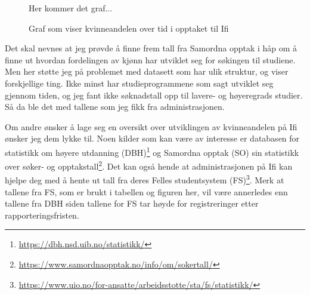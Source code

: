 \begin{figure}
	Her kommer det graf...
	\caption{Graf som viser kvinneandelen over tid i opptaket til Ifi}
	\label{figure:kvinneandel}
\end{figure}

Det skal nevnes at jeg prøvde å finne frem tall fra Samordna opptak i håp om å finne ut hvordan fordelingen av kjønn har utviklet seg for søkingen til studiene. Men her støtte jeg på problemet med datasett som har ulik struktur, og viser forskjellige ting. Ikke minst har studieprogrammene som sagt utviklet seg gjennom tiden, og jeg fant ikke søknadstall opp til lavere- og høyeregrads studier. Så da ble det med tallene som jeg fikk fra administrasjonen.

Om andre ønsker å lage seg en oversikt over utviklingen av kvinneandelen på Ifi ønsker jeg dem lykke til. Noen kilder som kan være av interesse er databasen for statistikk om høyere utdanning (DBH)\footnote{\url{https://dbh.nsd.uib.no/statistikk/}} og Samordna opptak (SO) sin statistikk over søker- og opptakstall\footnote{\url{https://www.samordnaopptak.no/info/om/sokertall/}}. Det kan også hende at administrasjonen på Ifi kan hjelpe deg med å hente ut tall fra deres Felles studentsystem (FS)\footnote{\url{https://www.uio.no/for-ansatte/arbeidsstotte/sta/fs/statistikk/}}. Merk at tallene fra FS, som er brukt i tabellen og figuren her, vil være annerledes enn tallene fra DBH siden tallene for FS tar høyde for registreringer etter rapporteringsfristen.